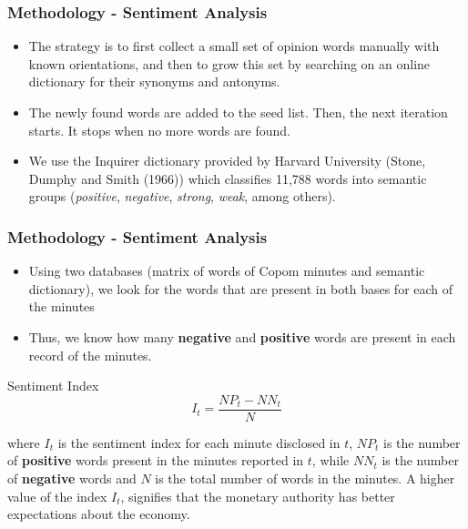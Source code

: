 \documentclass[aspectratio=169]{beamer}
\begin{document}
\begin{frame}\frametitle{Methodology - Sentiment Analysis}
\begin{itemize}
		\item The strategy is to first collect a small set of opinion words manually with known orientations, and then to grow this set by searching on an online dictionary for their synonyms and antonyms.
		\item The newly found words are added to the seed list. Then, the next iteration starts. It stops when no more words are found.
		\item We use the Inquirer dictionary provided by Harvard University (Stone, Dumphy and Smith (1966)) which classifies 11,788 words into semantic groups (\emph{positive}, \emph{negative}, \emph{strong}, \emph{weak}, among others).
\end{itemize}
\end{frame}

\begin{frame}\frametitle{Methodology - Sentiment Analysis}
  \begin{itemize}
    \item Using two databases (matrix of words of Copom minutes and semantic dictionary), we look for the words that are present in both bases for each of the minutes
    \item Thus, we know how many \textbf {negative} and \textbf {positive} words are present in each record of the minutes.
  \end{itemize}
  \begin{exampleblock}{Sentiment Index}
\[
{I}_{t} = \frac {{NP}_{t} - {NN}_{t}}{N} 
\]
  \end{exampleblock}
\noindent where ${I}_{t}$ is the sentiment index for each minute disclosed in $t$, ${NP}_{t}$ is the number of \textbf{positive} words present in the minutes reported in $t$, while ${NN}_{t}$ is the number of \textbf{negative} words and $N$ is the total number of words in the minutes. A higher value of the index ${I}_{t}$, signifies that the monetary authority has better expectations about the economy.
\end{frame}
\end{document}
